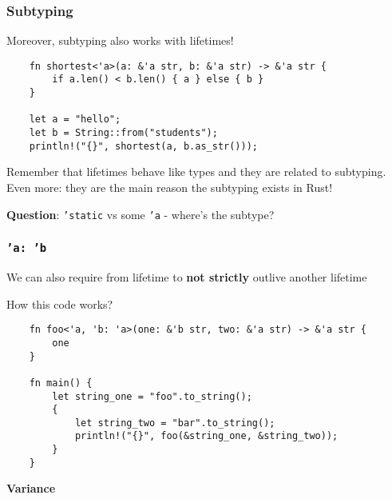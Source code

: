 \documentclass[aspectratio=1610,t]{beamer}
\begin{document}

\begin{frame}[fragile]
\frametitle{Subtyping}
Moreover, subtyping also works with lifetimes!

\begin{verbatim}
    fn shortest<'a>(a: &'a str, b: &'a str) -> &'a str {
        if a.len() < b.len() { a } else { b }
    }

    let a = "hello";
    let b = String::from("students");
    println!("{}", shortest(a, b.as_str()));
\end{verbatim}

Remember that lifetimes behave like types and they are related to subtyping. Even more: they are the main reason the subtyping exists in Rust!

\textbf{Question}: \texttt{'static} vs some \texttt{'a} - where's the subtype?
\end{frame}


\begin{frame}[fragile]
\frametitle{\texttt{'a: 'b}}
We can also require from lifetime to \textbf{not strictly} outlive another lifetime

How this code works?

\begin{verbatim}
    fn foo<'a, 'b: 'a>(one: &'b str, two: &'a str) -> &'a str {
        one
    }

    fn main() {
        let string_one = "foo".to_string();
        {
            let string_two = "bar".to_string();
            println!("{}", foo(&string_one, &string_two));
        }
    }
\end{verbatim}
\end{frame}


\begin{frame}[c]
\centering\Huge\textbf{Variance}
\end{frame}

\end{document}
